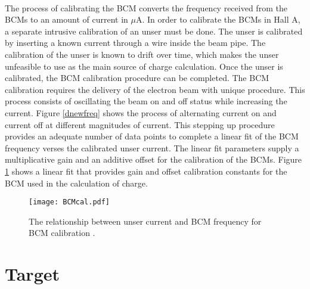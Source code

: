 	\paragraph{}The process of calibrating the BCM converts the frequency received from the BCMs to an amount of current in $\mu$A. In order to calibrate the BCMs in Hall A, a separate intrusive calibration of an unser must be done. The unser is calibrated by inserting a known current through a wire inside the beam pipe. The calibration of the unser is known to drift over time, which makes the unser unfeasible to use as the main source of charge calculation. Once the unser is calibrated, the BCM calibration procedure can be completed. The BCM calibration requires the delivery of the electron beam with unique procedure. This process consists of oscillating the beam on and off status while increasing the current. Figure \ref{dnewfreq} shows the process of alternating current on and current off at different magnitudes of current. This stepping up procedure provides an adequate number of data points to complete a linear fit of the BCM frequency verses the calibrated unser current. The linear fit parameters supply a multiplicative gain and an additive offset for the calibration of the BCMs. Figure \ref{bcmcal} shows a linear fit that provides gain and offset calibration constants for the BCM used in the calculation of charge. 
	\begin{figure}[t]
		\centering
		\texttt{[image: BCMcal.pdf]}
		\caption{The relationship between unser current and BCM frequency for BCM calibration \cite{MikeTh}.
			\label{bcmcal}}
	\end{figure}	
	  
\section{Target}\label{sec:target}
